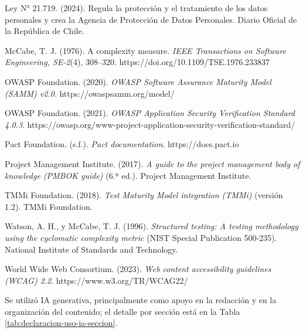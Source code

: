 \documentclass[subdoc]{../../comun/overfore}
\begin{document}
\begin{referencias}
\item Ley N° 21.719. (2024). Regula la protección y el tratamiento de los datos personales y crea la Agencia de Protección de Datos Personales. Diario Oficial de la República de Chile.
\item McCabe, T. J. (1976). A complexity measure. \emph{IEEE Transactions on Software Engineering, SE-2}(4), 308–320. https://doi.org/10.1109/TSE.1976.233837
\item OWASP Foundation. (2020). \emph{OWASP Software Assurance Maturity Model (SAMM) v2.0}. https://owaspsamm.org/model/
\item OWASP Foundation. (2021). \emph{OWASP Application Security Verification Standard 4.0.3}. https://owasp.org/www-project-application-security-verification-standard/
\item Pact Foundation. (s.f.). \emph{Pact documentation}. https://docs.pact.io
\item Project Management Institute. (2017). \emph{A guide to the project management body of knowledge (PMBOK guide)} (6.ª ed.). Project Management Institute.
\item TMMi Foundation. (2018). \emph{Test Maturity Model integration (TMMi)} (versión 1.2). TMMi Foundation.
\item Watson, A. H., y McCabe, T. J. (1996). \emph{Structured testing: A testing methodology using the cyclomatic complexity metric} (NIST Special Publication 500-235). National Institute of Standards and Technology.
\item World Wide Web Consortium. (2023). \emph{Web content accessibility guidelines (WCAG) 2.2}. https://www.w3.org/TR/WCAG22/
\end{referencias}

Se utilizó IA generativa, principalmente como apoyo en la redacción y en la organización del contenido; el detalle por sección está en la Tabla \ref{tab:declaracion-uso-ia-seccion}.
\end{document}
